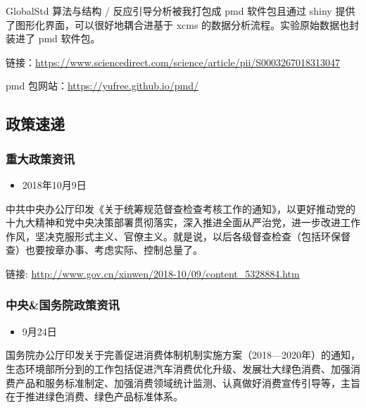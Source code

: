 \documentclass[
]{book}
\providecommand{\tightlist}{%
  \setlength{\itemsep}{0pt}\setlength{\parskip}{0pt}}
\begin{document}
GlobalStd 算法与结构 / 反应引导分析被我打包成 pmd 软件包且通过 shiny 提供了图形化界面，可以很好地耦合进基于 xcms 的数据分析流程。实验原始数据也封装进了 pmd 软件包。

链接：\url{https://www.sciencedirect.com/science/article/pii/S0003267018313047}

pmd 包网站：\url{https://yufree.github.io/pmd/}

\hypertarget{ux653fux7b56ux901fux9012-6}{%
\subsection*{政策速递}\label{ux653fux7b56ux901fux9012-6}}

\hypertarget{ux91cdux5927ux653fux7b56ux8d44ux8baf-6}{%
\subsubsection*{重大政策资讯}\label{ux91cdux5927ux653fux7b56ux8d44ux8baf-6}}

\begin{itemize}
\tightlist
\item
  2018年10月9日
\end{itemize}

中共中央办公厅印发《关于统筹规范督查检查考核工作的通知》，以更好推动党的十九大精神和党中央决策部署贯彻落实，深入推进全面从严治党，进一步改进工作作风，坚决克服形式主义、官僚主义。就是说，以后各级督查检查（包括环保督查）也要按章办事、考虑实际、控制总量了。

链接: \url{http://www.gov.cn/xinwen/2018-10/09/content_5328884.htm}

\hypertarget{ux4e2dux592eux56fdux52a1ux9662ux653fux7b56ux8d44ux8baf-6}{%
\subsubsection*{中央\&国务院政策资讯}\label{ux4e2dux592eux56fdux52a1ux9662ux653fux7b56ux8d44ux8baf-6}}

\begin{itemize}
\tightlist
\item
  9月24日
\end{itemize}

国务院办公厅印发关于完善促进消费体制机制实施方案（2018---2020年）的通知，生态环境部所分到的工作包括促进汽车消费优化升级、发展壮大绿色消费、加强消费产品和服务标准制定、加强消费领域统计监测、认真做好消费宣传引导等，主旨在于推进绿色消费、绿色产品标准体系。
\end{document}
